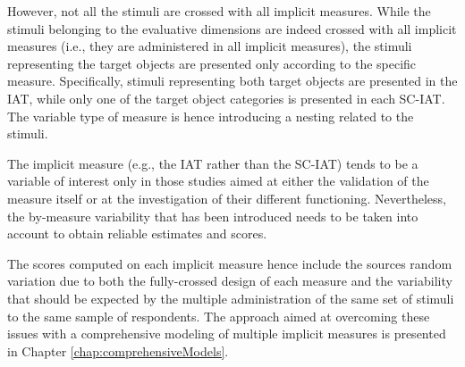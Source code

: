 \documentclass[12pt]{book}
\begin{document}
However, not all the stimuli are crossed with all implicit measures. While the stimuli belonging to the evaluative dimensions are indeed crossed with all implicit measures (i.e., they are administered in all implicit measures), the stimuli representing the target objects are presented only according to the specific measure. 
Specifically, stimuli representing both target objects are presented in the IAT, while only one of the target object categories is presented in each SC-IAT. The variable type of measure is hence introducing a nesting related to the stimuli. 
 
The implicit measure (e.g., the IAT rather than the SC-IAT) tends to be a variable of interest only in those studies aimed at either the validation of the measure itself or at the investigation of their different functioning.
Nevertheless, the by-measure variability that has been introduced needs to be taken into account to obtain reliable estimates and scores.


The scores computed on each implicit measure hence include the sources random variation due to both the fully-crossed design of each measure and the variability that should be expected by the multiple administration of the same set of stimuli to the same sample of respondents. 
The approach aimed at overcoming these issues with a comprehensive modeling of multiple implicit measures is presented in Chapter \ref{chap:comprehensiveModels}.

% 
%
\end{document}
